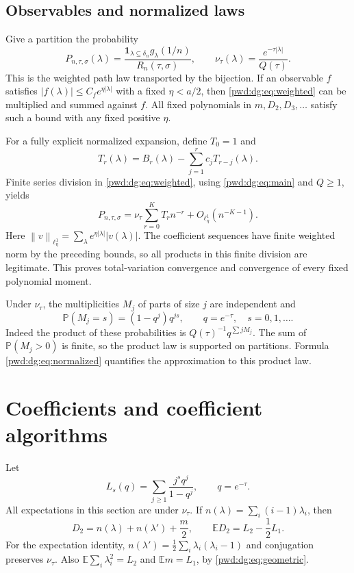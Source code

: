 \documentclass[11pt,letterpaper]{article}
\numberwithin{equation}{section}
\theoremstyle{remark}\newtheorem{remark}[theorem]{Remark}
\newcommand{\E}{\mathbb E}\newcommand{\Prob}{\mathbb P}
\newcommand{\ind}{\mathbf 1}
\newcommand{\norm}[1]{\left\lVert #1\right\rVert}
\begin{document}
\subsection{Observables and normalized laws}
Give a partition the probability
\begin{equation}\label{pwd:dg:eq:law}
 P_{n,\tau,\sigma}(\lambda)=
 \frac{\ind_{\lambda\subseteq\delta_n}g_\lambda(1/n)}{R_n(\tau,\sigma)},
 \qquad \nu_\tau(\lambda)=\frac{e^{-\tau|\lambda|}}{Q(\tau)}.
\end{equation}
This is the weighted path law transported by the bijection. If an observable $f$ satisfies $|f(\lambda)|\le C_f e^{\eta|\lambda|}$ with a fixed $\eta<a/2$, then \eqref{pwd:dg:eq:weighted} can be multiplied and summed against $f$. All fixed polynomials in $m,D_2,D_3,\ldots$ satisfy such a bound with any fixed positive $\eta$.

For a fully explicit normalized expansion, define $T_0=1$ and
\begin{equation}\label{pwd:dg:eq:T}
 T_r(\lambda)=B_r(\lambda)-\sum_{j=1}^rc_jT_{r-j}(\lambda).
\end{equation}
Finite series division in \eqref{pwd:dg:eq:weighted}, using \eqref{pwd:dg:eq:main} and $Q\ge1$, yields
\begin{equation}\label{pwd:dg:eq:normalized}
 P_{n,\tau,\sigma}=\nu_\tau\sum_{r=0}^KT_rn^{-r}
                 +O_{\ell^1_\eta}(n^{-K-1}).
\end{equation}
Here $\norm{v}_{\ell^1_\eta}=\sum_\lambda e^{\eta|\lambda|}|v(\lambda)|$. The coefficient sequences have finite weighted norm by the preceding bounds, so all products in this finite division are legitimate. This proves total-variation convergence and convergence of every fixed polynomial moment.

Under $\nu_\tau$, the multiplicities $M_j$ of parts of size $j$ are independent and
\begin{equation}\label{pwd:dg:eq:geometric}
 \Prob(M_j=s)=(1-q^j)q^{js},\qquad q=e^{-\tau},\quad s=0,1,\ldots.
\end{equation}
Indeed the product of these probabilities is $Q(\tau)^{-1}q^{\sum jM_j}$. The sum of $\Prob(M_j>0)$ is finite, so the product law is supported on partitions. Formula \eqref{pwd:dg:eq:normalized} quantifies the approximation to this product law.

\section{Coefficients and coefficient algorithms}\label{pwd:dg:sec:coefficients}
Let
\begin{equation}\label{pwd:dg:eq:Lambert}
 L_s(q)=\sum_{j\ge1}\frac{j^s q^j}{1-q^j},\qquad q=e^{-\tau}.
\end{equation}
All expectations in this section are under $\nu_\tau$. If $n(\lambda)=\sum_i(i-1)\lambda_i$, then
\begin{equation}\label{pwd:dg:eq:D2}
 D_2=n(\lambda)+n(\lambda')+\frac m2,
 \qquad \E D_2=L_2-\frac12L_1.
\end{equation}
For the expectation identity, $n(\lambda')=\frac12\sum_i\lambda_i(\lambda_i-1)$ and conjugation preserves $\nu_\tau$. Also $\E\sum_i\lambda_i^2=L_2$ and $\E m=L_1$, by \eqref{pwd:dg:eq:geometric}.
\end{document}
